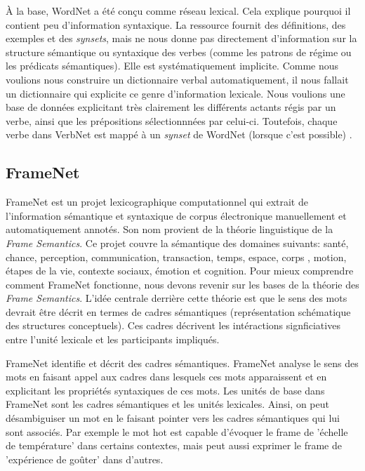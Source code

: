 À la base, WordNet a été conçu comme réseau lexical. Cela explique pourquoi il contient peu d'information syntaxique. La ressource fournit des définitions, des exemples et des \emph{synsets}, mais ne nous donne pas directement d'information sur la structure sémantique ou syntaxique des verbes (comme les patrons de régime ou les prédicats sémantiques). Elle est systématiquement implicite. Comme nous voulions nous construire un dictionnaire verbal automatiquement, il nous fallait un dictionnaire qui explicite ce genre d'information lexicale. Nous voulions une base de données explicitant très clairement les différents actants régis par un verbe, ainsi que les prépositions sélectionnnées par celui-ci. Toutefois, chaque verbe dans VerbNet est mappé à un \emph{synset} de WordNet (lorsque c'est possible) \citep{SchulerVerbnetBroadcoverageComprehensive2005}.

\subsection{FrameNet}
FrameNet est un projet lexicographique computationnel qui extrait de l'information sémantique et syntaxique de corpus électronique manuellement et automatiquement annotés. Son nom provient de la théorie linguistique de la \emph{Frame Semantics}\citep{BakerBerkeleyFrameNetProject1998}. Ce projet couvre la sémantique des domaines suivants: santé, chance, perception, communication, transaction, temps, espace, corps , motion, étapes de la vie, contexte sociaux, émotion et cognition. Pour mieux comprendre comment FrameNet fonctionne, nous devons revenir sur les bases de la théorie des \emph{Frame Semantics}. L'idée centrale derrière cette théorie est que le sens des mots devrait être décrit en termes de cadres sémantiques (représentation schématique des structures conceptuels). Ces cadres décrivent les intéractions signficiatives entre l'unité lexicale et les participants impliqués.

FrameNet identifie et décrit des cadres sémantiques. FrameNet analyse le sens des mots en faisant appel aux cadres dans lesquels ces mots apparaissent et en explicitant les propriétés syntaxiques de ces mots. Les unités de base dans FrameNet sont les cadres sémantiques et les unités lexicales. Ainsi, on peut désambiguiser un mot en le faisant pointer vers les cadres sémantiques qui lui sont associés. Par exemple le mot hot est capable d'évoquer le frame de 'échelle de température' dans certains contextes, mais peut aussi exprimer le frame de 'expérience de goûter' dans d'autres.

